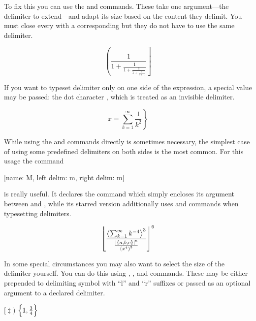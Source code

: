 To fix this you can use the  and  commands. These take one
argument---the delimiter to extend---and adapt its size based on the content
they delimit. You must close every  with a corresponding 
but they do not have to use the same delimiter.
\begin{chktexignore}
\begin{example}
\[
  \left(
    \frac{1}{1 +
      \frac{1}{1 +
        \frac{1}{1 +
          \frac{1}{1 +
            \ldots}}}}
  \right]
\]
\end{example}
\end{chktexignore}
If you want to typeset delimiter only on one side of the expression, a special
value may be passed: the dot character , which is treated as an invisible
delimiter.
\begin{example}
\[
  x = \left.
    \sum_{k=1}^{\infty}
      \frac{1}{k^2}
  \right\}
\]
\end{example}

While using the  and  commands directly is sometimes
necessary, the simplest case of using some predefined delimiters on both sides
is the most common. For this usage the command
\begin{lscommand}
  [name: M, left delim: m, right delim: m]
\end{lscommand}
is really useful. It declares the  command which simply encloses its
argument between  and , while its starred
version additionally uses  and  commands when typesetting
delimiters.
\begin{chktexignore}
\begin{example}[vertical_mode, examplewidth=0.8\linewidth]
\DeclarePairedDelimiter{\set}{\{}{\}}
\DeclarePairedDelimiter{\size}{\lvert}{\rvert}
\DeclarePairedDelimiter{\mean}{\langle}{\rangle}
\DeclarePairedDelimiter{\floor}{\lfloor}{\rfloor}
\DeclarePairedDelimiter{\parens}{(}{)}
\[
  \floor*{
    \frac
    {\mean*{\sum_{k=1}^{\infty} k^{-4}}^3}
    {\frac{\size*{\set{a,b,c}}^8}{\parens*{x^4}^3}}
  }^6
\]
\end{example}
\end{chktexignore}

In some special circumstances you may also want to select the size of the
delimiter yourself. You can do this using  , ,  and
 commands. These may be either prepended to delimiting symbol with
\enquote{l} and \enquote{r} suffixes or passed as an optional argument to a
declared delimiter.
\begin{chktexignore}
  \begin{example}
\DeclarePairedDelimiter{%
  \set}{\{}{\}}
\( \bigl[ \ddagger \Biggr) \)
\quad %
\( \set[\Big]{1,\frac{3}{4}} \)
\end{example}
\end{chktexignore}


